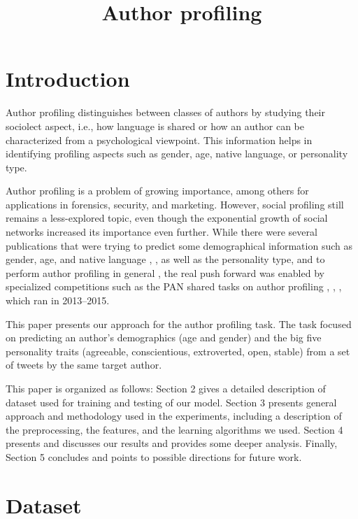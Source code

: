 \documentclass[10pt, a4paper]{article}
\title{ Author profiling}
\begin{document}
\maketitleabstract

\section{Introduction}

Author profiling distinguishes between classes of authors by studying their sociolect aspect, i.e., how language is shared or how an author can be characterized from a psychological viewpoint. This information helps in identifying profiling aspects such as gender, age, native language, or personality type. 
\par
\vspace{1mm}
Author profiling is a problem of growing importance, among others for applications in forensics, security, and marketing. However, social profiling still remains a less-explored topic, even though the exponential growth of social networks increased its importance even further. While there were several publications that were trying to predict some demographical information such as gender, age, and native language \citep{argamon2003}, \citep{peersman2011}, as well as the personality type, and to perform author profiling in general \citep{argamon2009}, the real push forward was enabled by specialized competitions such as the PAN shared tasks on author profiling \citep{pardo2013}, \citep{rangel2014}, \citep{rangel2015}, which ran in 2013–2015. 
\par\vspace{1mm}
This paper presents our approach for the author profiling task. The task focused on predicting an author’s demographics (age and gender) and the big five personality traits \citep{mccrae2008} (agreeable, conscientious, extroverted, open, stable) from a set of tweets by the same target author.
\par\vspace{1mm}
This paper is organized as follows: Section 2
gives a detailed description of dataset used for
training and testing of our model. Section 3
presents general approach and methodology used
in the experiments, including a description of the
preprocessing, the features, and the learning
algorithms we used. Section 4 presents and
discusses our results and provides some deeper
analysis. Finally, Section 5 concludes and points
to possible directions for future work.

\section{Dataset}
\end{document}
